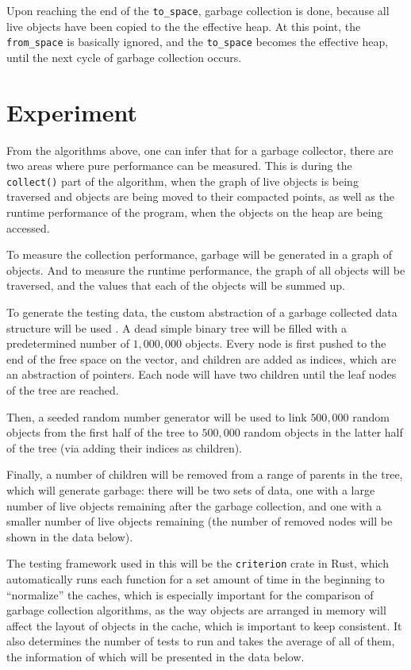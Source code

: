 \documentclass[index]{subfiles}
\begin{document}
Upon reaching the end of the \verb+to_space+, garbage collection is done, because all live objects have been copied to the the effective heap. At this point, the \verb+from_space+ is basically ignored, and the \verb+to_space+ becomes the effective heap, until the next cycle of garbage collection occurs.


\section{Experiment}

From the algorithms above, one can infer that for a garbage collector, there are two areas where pure performance can be measured. This is during the \verb+collect()+ part of the algorithm, when the graph of live objects is being traversed and objects are being moved to their compacted points, as well as the runtime performance of the program, when the objects on the heap are being accessed.

To measure the collection performance, garbage will be generated in a graph of objects. And to measure the runtime performance, the graph of all objects will be traversed, and the values that each of the objects will be summed up.

To generate the testing data, the custom abstraction of a garbage collected data structure will be used \cite{youtube_introductory_video}. A dead simple binary tree will be filled with a predetermined number of \(1,000,000\) objects. Every node is first pushed to the end of the free space on the vector, and children are added as indices, which are an abstraction of pointers. Each node will have two children until the leaf nodes of the tree are reached.

Then, a seeded random number generator will be used to link \(500,000\) random objects from the first half of the tree to \(500,000\) random objects in the latter half of the tree (via adding their indices as children).

Finally, a number of children will be removed from a range of parents in the tree, which will generate garbage: there will be two sets of data, one with a large number of live objects remaining after the garbage collection, and one with a smaller number of live objects remaining (the number of removed nodes will be shown in the data below).

The testing framework used in this will be the \verb+criterion+ crate in Rust, which automatically runs each function for a set amount of time in the beginning to ``normalize'' the caches, which is especially important \cite{a_unified_theory_of_garbage_collection} for the comparison of garbage collection algorithms, as the way objects are arranged in memory will affect the layout of objects in the cache, which is important to keep consistent. It also determines the number of tests to run and takes the average of all of them, the information of which will be presented in the data below.
\end{document}
